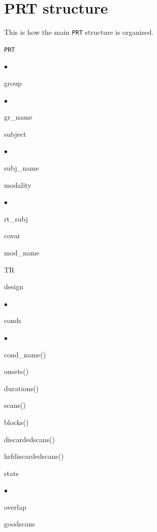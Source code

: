 \chapter{PRT structure}
\label{sec:PRTstruct}
\minitoc

This is how the main {\tt PRT} structure is organised.

{\tt PRT}
\begin{list}{$\bullet$}
	{\setlength{\labelsep}{.2cm}\setlength{\itemindent}{0cm}\setlength{\leftmargin}{0.2cm}}
\item group
\begin{list}{$\bullet$}
	{\setlength{\labelsep}{.2cm}\setlength{\itemindent}{0cm}\setlength{\leftmargin}{0.7cm}}
\item gr\_name
\item subject
\begin{list}{$\bullet$}
	{\setlength{\labelsep}{.2cm}\setlength{\itemindent}{0cm}\setlength{\leftmargin}{1.2cm}}
\item subj\_name
\item modality
\begin{list}{$\bullet$}
	{\setlength{\labelsep}{.2cm}\setlength{\itemindent}{0cm}\setlength{\leftmargin}{1.7cm}}
\item rt\_subj
\item covar
\item mod\_name
\item TR
\item design
\begin{list}{$\bullet$}
	{\setlength{\labelsep}{.2cm}\setlength{\itemindent}{0cm}\setlength{\leftmargin}{2.2cm}}
\item conds
\begin{list}{$\bullet$}
	{\setlength{\labelsep}{.2cm}\setlength{\itemindent}{0cm}\setlength{\leftmargin}{2.7cm}}
\item cond\_name()
\item onsets()
\item durations()
\item scans()
\item blocks()
\item discardedscans()
\item hrfdiscardedscans()
\end{list}
\item stats
\begin{list}{$\bullet$}
	{\setlength{\labelsep}{.2cm}\setlength{\itemindent}{0cm}\setlength{\leftmargin}{2.7cm}}
\item overlap
\item goodscans

\end{list}
\end{list}
\end{list}
\end{list}
\end{list}
\end{list}
